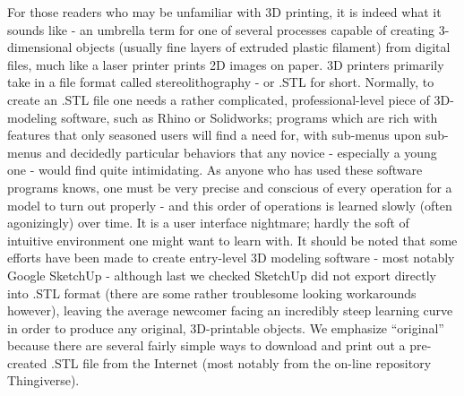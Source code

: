 For those readers who may be unfamiliar with 3D printing, it is indeed what it
sounds like - an umbrella term for one of several processes capable of creating
3-dimensional objects (usually fine layers of extruded plastic filament) from
digital files, much like a laser printer prints 2D images on paper. 3D printers
primarily take in a file format called stereolithography - or .STL for short.
Normally, to create an .STL file one needs a rather complicated,
professional-level piece of 3D-modeling software, such as Rhino\cite{Rhino} or
Solidworks\cite{Solidworks}; programs which are rich with features that only
seasoned users will find a need for, with sub-menus upon sub-menus and decidedly
particular behaviors that any novice - especially a young one - would find quite
intimidating. As anyone who has used these software programs knows, one must be
very precise and conscious of every operation for a model to turn out properly -
and this order of operations is learned slowly (often agonizingly) over time. It
is a user interface nightmare; hardly the soft of intuitive environment one
might want to learn with. It should be noted that some efforts have been made to
create entry-level 3D modeling software - most notably Google
SketchUp\cite{SketchUp} - although last we checked SketchUp did not export
directly into .STL format (there are some rather troublesome looking workarounds
however), leaving the average newcomer facing an incredibly steep learning curve
in order to produce any original, 3D-printable objects. We emphasize
``original'' because there are several fairly simple ways to download and print
out a pre-created .STL file from the Internet (most notably from the on-line
repository Thingiverse\cite{thingiverse}).


